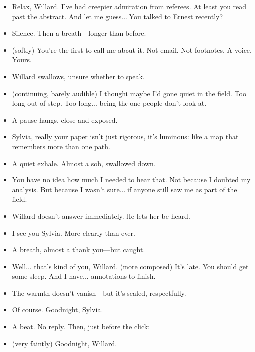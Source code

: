 \begin{itemize}[leftmargin=2cm, label={}]


\item[\textbf{Sylvia:}]  
Relax, Willard. I’ve had creepier admiration from referees.  
At least you read past the abstract.
And let me guess...  
You talked to Ernest recently?
\item[] Silence. Then a breath—longer than before.

\item[\textbf{Sylvia:}]  (softly)
You’re the first to call me about it.  
Not email. Not footnotes.  
A voice. Yours.

\item[] Willard swallows, unsure whether to speak.

\item[]  (continuing, barely audible)
I thought maybe I’d gone quiet in the field.  
Too long out of step.  
Too long... being the one people don’t look at.

\item[] A pause hangs, close and exposed.

\item[\textbf{Willard:}]  
Sylvia, really your paper isn’t just rigorous,  
it’s luminous: like a map that remembers more than one path.

\item[] A quiet exhale. Almost a sob, swallowed down.

\item[\textbf{Sylvia:}]  
You have no idea how much I needed to hear that.  
Not because I doubted my analysis.  
But because I wasn’t sure... if anyone still saw me as part of the field.

\item[] Willard doesn’t answer immediately. He lets her be heard.

\item[\textbf{Willard:}]  
I see you Sylvia.  
More clearly than ever.

\item[] A breath, almost a thank you—but caught.

\item[\textbf{Sylvia :}] Well... that’s kind of you, Willard. (more composed)
It’s late. You should get some sleep.  
And I have... annotations to finish.

\item[] The warmth doesn’t vanish—but it’s sealed, respectfully.

\item[\textbf{Willard:}]  
Of course.  
Goodnight, Sylvia.

\item[] A beat. No reply.  
Then, just before the click:

\item[\textbf{Sylvia :}]  (very faintly)
Goodnight, Willard.

\end{itemize}


